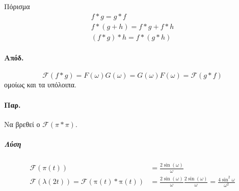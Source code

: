 \documentclass[11pt,a4paper,titlepage,final]{article}
\begin{document}
\begin{theorem*}{Πόρισμα}
\begin{gather*}
f*g=g*f\\
f*(g+h)=f*g+f*h\\
(f*g)*h=f*(g*h)
\end{gather*}
\end{theorem*}
\paragraph{Απόδ.}
\[
\mathscr{F}(f*g)=F(\omega)G(\omega)=G(\omega)F(\omega)=\mathscr{F}(g*f)
\]
ομοίως και τα υπόλοιπα.

\paragraph{Παρ.}
Να βρεθεί ο \(\mathscr{F}(\pi*\pi)\).
\subparagraph{Λύση}
\begin{align*}
\mathscr{F}(\pi(t)) &= \frac{2\sin(\omega)}{\omega} \\
\mathscr{F}(\lambda(2t)) = \mathscr{F}(\mathrm\pi(t) * \mathrm\pi(t)) &= \frac{2\sin(\omega)}{\omega} \frac{2\sin(\omega)}{\omega} = \frac{4\sin^2\omega}{\omega^2}
\end{align*}

\paragraph{}
\end{document}
